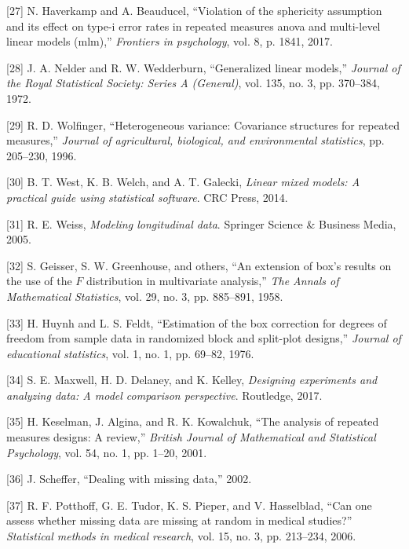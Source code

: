 \documentclass[
]{article}
\begin{document}
\leavevmode\hypertarget{ref-haverkamp2017}{}%
{[}27{]} N. Haverkamp and A. Beauducel, ``Violation of the sphericity
assumption and its effect on type-i error rates in repeated measures
anova and multi-level linear models (mlm),'' \emph{Frontiers in
psychology}, vol. 8, p. 1841, 2017.

\leavevmode\hypertarget{ref-nelder1972}{}%
{[}28{]} J. A. Nelder and R. W. Wedderburn, ``Generalized linear
models,'' \emph{Journal of the Royal Statistical Society: Series A
(General)}, vol. 135, no. 3, pp. 370--384, 1972.

\leavevmode\hypertarget{ref-wolfinger1996}{}%
{[}29{]} R. D. Wolfinger, ``Heterogeneous variance: Covariance
structures for repeated measures,'' \emph{Journal of agricultural,
biological, and environmental statistics}, pp. 205--230, 1996.

\leavevmode\hypertarget{ref-west2014}{}%
{[}30{]} B. T. West, K. B. Welch, and A. T. Galecki, \emph{Linear mixed
models: A practical guide using statistical software}. CRC Press, 2014.

\leavevmode\hypertarget{ref-weiss2005}{}%
{[}31{]} R. E. Weiss, \emph{Modeling longitudinal data}. Springer
Science \& Business Media, 2005.

\leavevmode\hypertarget{ref-geisser1958}{}%
{[}32{]} S. Geisser, S. W. Greenhouse, and others, ``An extension of
box's results on the use of the \(F\) distribution in multivariate
analysis,'' \emph{The Annals of Mathematical Statistics}, vol. 29, no.
3, pp. 885--891, 1958.

\leavevmode\hypertarget{ref-huynh1976}{}%
{[}33{]} H. Huynh and L. S. Feldt, ``Estimation of the box correction
for degrees of freedom from sample data in randomized block and
split-plot designs,'' \emph{Journal of educational statistics}, vol. 1,
no. 1, pp. 69--82, 1976.

\leavevmode\hypertarget{ref-maxwell2017}{}%
{[}34{]} S. E. Maxwell, H. D. Delaney, and K. Kelley, \emph{Designing
experiments and analyzing data: A model comparison perspective}.
Routledge, 2017.

\leavevmode\hypertarget{ref-keselman2001}{}%
{[}35{]} H. Keselman, J. Algina, and R. K. Kowalchuk, ``The analysis of
repeated measures designs: A review,'' \emph{British Journal of
Mathematical and Statistical Psychology}, vol. 54, no. 1, pp. 1--20,
2001.

\leavevmode\hypertarget{ref-scheffer2002}{}%
{[}36{]} J. Scheffer, ``Dealing with missing data,'' 2002.

\leavevmode\hypertarget{ref-potthoff2006}{}%
{[}37{]} R. F. Potthoff, G. E. Tudor, K. S. Pieper, and V. Hasselblad,
``Can one assess whether missing data are missing at random in medical
studies?'' \emph{Statistical methods in medical research}, vol. 15, no.
3, pp. 213--234, 2006.
\end{document}
